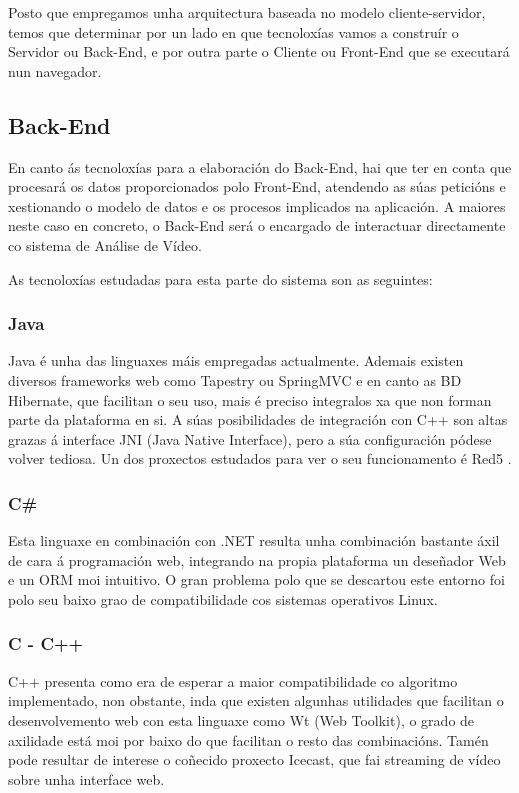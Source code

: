     Posto que empregamos unha arquitectura baseada no modelo cliente-servidor, temos que determinar 
    por un lado en que tecnoloxías vamos a construír o Servidor ou Back-End, e por outra parte o 
    Cliente ou Front-End que se executará nun navegador.  

    \subsection{Back-End}
        En canto ás tecnoloxías para a elaboración do Back-End, hai que ter en conta que procesará
        os datos proporcionados polo Front-End, atendendo as súas peticións e xestionando o modelo de 
        datos e os procesos implicados na aplicación. A maiores neste caso en concreto, o Back-End será
        o encargado de interactuar directamente co sistema de Análise de Vídeo.
        
        As tecnoloxías estudadas para esta parte do sistema son as seguintes:

        \subsubsection{Java}
        Java é unha das linguaxes máis empregadas actualmente. Ademais existen diversos
        frameworks web como Tapestry ou SpringMVC e en canto as BD Hibernate, que facilitan o 
        seu uso, mais é preciso integralos xa que non forman parte da plataforma en si. A súas 
        posibilidades de integración con C++ son altas grazas á interface JNI (Java Native 
        Interface), pero a súa configuración pódese volver tediosa. Un dos proxectos estudados
        para ver o seu funcionamento é Red5 \cite{red5-github-url}.
        
        \subsubsection{C\#}
        Esta linguaxe en combinación con .NET resulta unha combinación bastante áxil de cara
        á programación web, integrando na propia plataforma un deseñador Web e un ORM moi 
        intuitivo. O gran problema polo que se descartou este entorno foi polo seu baixo grao
        de compatibilidade cos sistemas operativos Linux.
        
        \subsubsection{C - C++}
        C++ presenta como era de esperar a maior compatibilidade co algoritmo implementado, non
        obstante, inda que existen algunhas utilidades que facilitan o desenvolvemento web con 
        esta linguaxe como Wt (Web Toolkit)\cite{wt-url}, o grado de axilidade está moi por 
        baixo do que facilitan o resto das combinacións. Tamén pode resultar de interese o
        coñecido proxecto Icecast\cite{icecast-url}, que fai streaming de vídeo sobre unha 
        interface web.
        
